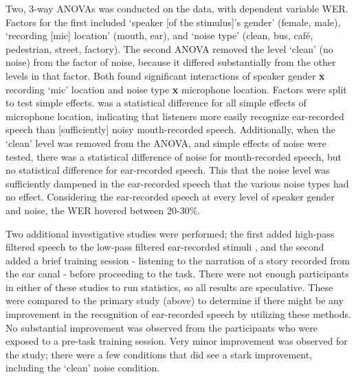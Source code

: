 Two, 3-way ANOVAs was conducted on the data, with dependent variable WER.  Factors for the first included `speaker [of the stimulus]'s gender' (female, male), `recording [mic] location' (mouth, ear), and `noise type' (clean, bus, caf\'{e}, pedestrian, street, factory).  The second ANOVA removed the level `clean' (no noise) from the factor of noise, because it differed substantially from the other levels in that factor.  Both \DIFdelbegin {}\DIFdelend \DIFaddbegin {}\DIFaddend found significant interactions of speaker gender \textbf{x} recording `mic' location and noise type \textbf{x} microphone location.  Factors were split to test simple effects.  \DIFdelbegin {}\DIFdelend \DIFaddbegin {}\DIFaddend was a statistical difference for all simple effects of microphone location, indicating that listeners more easily recognize ear-recorded speech than [sufficiently] noisy mouth-recorded speech.  Additionally, when the `clean' level was removed from the ANOVA, and simple effects of noise were tested, there was a statistical difference of noise for mouth-recorded speech, but no statistical difference for ear-recorded speech.  This \DIFdelbegin {}\DIFdelend \DIFaddbegin {}\DIFaddend that the noise level was sufficiently dampened in the ear-recorded speech that the various noise types had no effect.  Considering the ear-recorded speech at every level of speaker gender and noise, the WER hovered \DIFdelbegin {}\DIFdelend \DIFaddbegin {}\DIFaddend between 20-30\%.

Two additional investigative studies were performed; the first added high-pass filtered \DIFdelbegin {}\DIFdelend \DIFaddbegin {}\DIFaddend speech to the low-pass filtered ear-recorded stimuli \DIFaddbegin {}\DIFaddend , and the second added a brief training session - listening to the narration of a story recorded from the ear canal - before proceeding to the task.  There were not enough participants in either of these studies to run statistics, so all results are speculative.  These were compared to the primary study (above) to determine if there might be any improvement in the recognition of ear-recorded speech by utilizing these methods.  No substantial improvement was observed from the participants who were exposed to a pre-task training session.  Very minor improvement was observed for the \DIFdelbegin {}\DIFdelend \DIFaddbegin {}\DIFaddend study; there were a few conditions that did see a stark improvement, including the `clean' noise condition.

